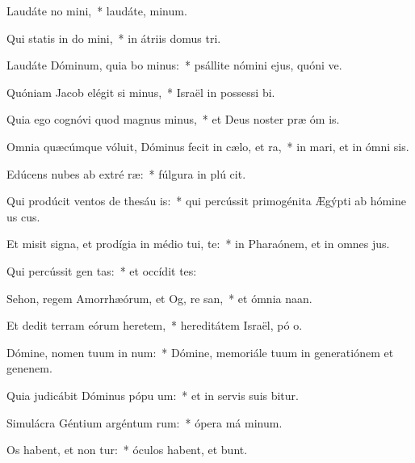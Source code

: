 \item Laudáte no mini,~* laudáte,  minum.
\item Qui statis in do mini,~* in átriis domus  tri.
\item Laudáte Dóminum, quia bo minus:~* psállite nómini ejus, quóni ve.
\item Quóniam Jacob elégit si minus,~* Israël in possessi bi.
\item Quia ego cognóvi quod magnus  minus,~* et Deus noster præ óm is.
\item Omnia quæcúmque vóluit, Dóminus fecit in cælo, et  ra,~* in mari, et in ómni sis.
\item Edúcens nubes ab extré ræ:~* fúlgura in plú cit.
\item Qui prodúcit ventos de thesáu is:~* qui percússit primogénita Ægýpti ab hómine us  cus.
\item Et misit signa, et prodígia in médio tui, te:~* in Pharaónem, et in omnes  jus.
\item Qui percússit gen tas:~* et occídit  tes:
\item Sehon, regem Amorrhæórum, et Og, re san,~* et ómnia  naan.
\item Et dedit terram eórum heretem,~* hereditátem Israël, pó o.
\item Dómine, nomen tuum in num:~* Dómine, memoriále tuum in generatiónem et genenem.
\item Quia judicábit Dóminus pópu um:~* et in servis suis bitur.
\item Simulácra Géntium argéntum  rum:~* ópera má minum.
\item Os habent, et non tur:~* óculos habent, et  bunt.
